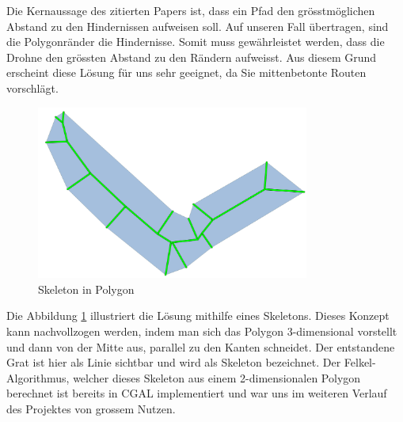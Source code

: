 Die Kernaussage des zitierten Papers \cite[]{SkeletonUAV} ist, dass ein Pfad den grösstmöglichen Abstand zu den Hindernissen aufweisen soll. Auf unseren Fall übertragen, sind die Polygonränder die Hindernisse. Somit muss gewährleistet werden, dass die Drohne den grössten Abstand zu den Rändern aufweisst. Aus diesem Grund erscheint diese Lösung für uns sehr geeignet, da Sie mittenbetonte Routen vorschlägt. \\
\begin{figure}[H]
	\centering
	\includegraphics[width=0.8\textwidth]{images/routing/skeleton.png}
	\caption{Skeleton in Polygon}
	\label{fig:skeleton-in-polygon}
\end{figure}
Die Abbildung \ref{fig:skeleton-in-polygon} illustriert die Lösung mithilfe eines Skeletons. Dieses Konzept kann nachvollzogen werden, indem man sich das Polygon 3-dimensional vorstellt und dann  von der Mitte aus, parallel zu den Kanten schneidet. Der entstandene Grat ist hier als Linie sichtbar und wird als Skeleton bezeichnet. Der Felkel-Algorithmus, welcher dieses Skeleton aus einem 2-dimensionalen Polygon berechnet ist bereits in \Gls{CGAL} implementiert \cite{SkeletonCGAL} und war uns im weiteren Verlauf des Projektes von grossem Nutzen.\\


